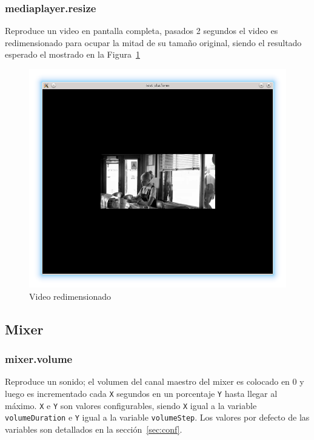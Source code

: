 \documentclass{article}
\begin{document}
\FloatBarrier
\subsubsection{mediaplayer.resize}
Reproduce un video en pantalla completa, pasados 2 segundos el video es redimensionado para ocupar la mitad de su tamaño original, siendo el resultado esperado el mostrado en la Figura~\ref{fig:mediaplayer_resize}

\begin{figure}[h]
\centering
\includegraphics[scale=0.45]{resize_mediaplayer}
\caption{Video redimensionado}
\label{fig:mediaplayer_resize}
\end{figure}

\FloatBarrier

\subsection{Mixer}
\label{sec:mixer_test}

\FloatBarrier

\subsubsection{mixer.volume}
\label{sec:mixer_volume}
Reproduce un sonido; el volumen del canal maestro del mixer es colocado en 0 y luego es incrementado cada \texttt{X} segundos en un porcentaje \texttt{Y} hasta llegar al máximo.
\texttt{X} e \texttt{Y} son valores configurables, siendo \texttt{X} igual a la variable \texttt{volumeDuration} e \texttt{Y} igual a la variable \texttt{volumeStep}. Los valores por defecto de las variables son detallados en la sección~\ref{sec:conf}.
\end{document}
